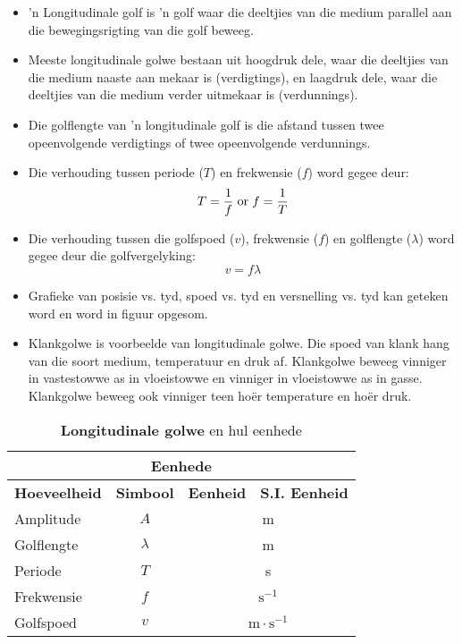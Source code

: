 \nopagebreak
      \label{m38783*id293550}\begin{itemize}[noitemsep] 
            \label{m38783*uid20}\item 'n Longitudinale golf is 'n golf waar die deeltjies van die medium parallel aan die bewegingsrigting van die golf beweeg.
\label{m38783*uid21}\item Meeste longitudinale golwe bestaan uit hoogdruk dele, waar die deeltjies van die medium naaste aan mekaar is (verdigtings), en laagdruk dele, waar die deeltjies van die medium verder uitmekaar is (verdunnings).
\label{m38783*uid22}\item Die golflengte van 'n longitudinale golf is die afstand tussen twee opeenvolgende verdigtings of twee opeenvolgende verdunnings.
\label{m38783*uid23}\item Die verhouding tussen periode ($T$) en frekwensie ($f$) word gegee deur:
\label{m38783*id293619}\nopagebreak\noindent{}
    \begin{equation*}\nonumber
    T=\frac{1}{f}\phantom{\rule{3pt}{0ex}}\text{or}\phantom{\rule{3pt}{0ex}}f=\frac{1}{T}
      \end{equation*}
    \label{m38783*uid24}\item Die verhouding tussen die golfspoed ($v$), frekwensie ($f$) en golflengte ($\lambda$) word gegee deur die golfvergelyking:
\label{m38783*id293694}\nopagebreak\noindent{}
    \begin{equation*}\nonumber
    v=f\lambda
      \end{equation*}
    \label{m38783*uid25}\item Grafieke van posisie vs. tyd, spoed vs. tyd en versnelling vs. tyd kan geteken word en word in figuur \label{m38783*uid26} opgesom.
\item Klankgolwe is voorbeelde van longitudinale golwe. Die spoed van klank hang van die soort medium, temperatuur en druk af. Klankgolwe beweeg vinniger in vastestowwe as in vloeistowwe en vinniger in vloeistowwe as in gasse. Klankgolwe beweeg ook vinniger teen ho\"er temperature en ho\"er druk.
\end{itemize}
\begin{table}[H]
\begin{center}
\begin{tabular}{|l|c|c|c|}\hline \hline 
\multicolumn{4}{|c|}{\textbf{Eenhede}}\\ \hline \hline
\textbf{Hoeveelheid} & \textbf{Simbool} & \textbf{Eenheid} & \textbf{S.I. Eenheid}\\ \hline
Amplitude & $A$ & \multicolumn{2}{c|}{m} \\ \hline
Golflengte & $\lambda$ & \multicolumn{2}{c|}{m}  \\ \hline
Periode & $T$ & \multicolumn{2}{c|}{s}  \\ \hline
Frekwensie & $f$ & \multicolumn{2}{c|}{$\text{s}^{-1}$}  \\ \hline
Golfspoed & $v$ & \multicolumn{2}{c|}{$\text{m} \cdot \text{s}^{-1}$} \\ \hline
\end{tabular}
\end{center}
\caption{\textbf{Longitudinale golwe} en hul eenhede}
\label{table:electricity::units}
\end{table}
